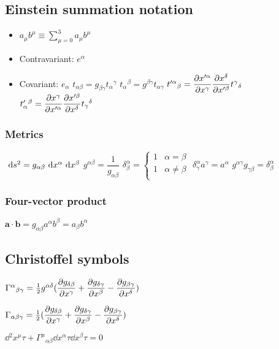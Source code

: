 		\subsection{Einstein summation notation}
        
\begin{itemize}
\item \( a_\mu b^\mu \equiv \sum\limits^3_{\mu=0} a_\mu b^\mu \)
\item Contravariant: $e^\alpha$
\item Covariant: $e_\alpha$
\itemt \( t_{\alpha\beta} = g_{\beta\gamma} t_\alpha{}^\gamma \)
\itemt \( t_\alpha{}^\beta = g^{\beta\gamma} t_{\alpha\gamma} \)
\itemt \( t'^\alpha{}_\beta = \dfrac{\partial x'^\alpha}{\partial x^\gamma} \dfrac{\partial x^\delta}{\partial x'^\beta} t^\gamma{}_\delta\)
\itemt \( t'_\alpha{}^\beta = \dfrac{\partial x^\gamma}{\partial x'^\alpha} \dfrac{\partial x'^\beta}{\partial x^\delta} t_\gamma{}^\delta\)
\end{itemize}

\subsubsection{Metrics}
\begin{itemize}
\itemt \( \ \mathrm{d}s^2 = g_{\alpha\beta} \ \mathrm{d}x^\alpha \ \mathrm{d}x^\beta \)
\itemt \( g^{\alpha\beta} = \dfrac{1}{g_{\alpha\beta}} \)
\itemt \( \delta^\alpha_\beta =
\begin{cases}
      1 & \alpha = \beta \\
      1	& \alpha \neq \beta \\
\end{cases}
\)
\itemt \( \delta^\alpha_\gamma a^\gamma = a^\alpha \)
\itemt \( g^{\alpha\gamma}g_{\gamma\beta} = \delta^\alpha_\beta \) %
\end{itemize}

\subsubsection{Four-vector product}
\begin{itemize}
\itemt \( \textbf{a}\cdot \textbf{b} = g_{\alpha\beta}a^\alpha b^\beta = a_\beta b^\alpha\)
\end{itemize}
        
		\subsection{Christoffel symbols}

\begin{itemize}
\itemt \( \Gamma^\alpha{}_{\beta\gamma} = \frac{1}{2} g^{\alpha\delta} (\dfrac{\partial g_{\delta\beta}}{\partial x^\gamma} + \dfrac{\partial g_{\delta\gamma}}{\partial x^\beta} - \dfrac{\partial g_{\beta\gamma}}{\partial x^\delta})  \) 

\itemt \( \Gamma_{\alpha\beta\gamma} = \frac{1}{2}(\dfrac{\partial g_{\delta\beta}}{\partial x^\gamma} + \dfrac{\partial g_{\delta\gamma}}{\partial x^\beta} - \dfrac{\partial g_{\beta\gamma}}{\partial x^\delta})  \) 

\itemt \( \dd{^2 x^\mu}{\tau} + \Gamma^\mu{}_{\alpha\beta} \dd{x^\alpha}{\tau} \dd{x^\beta}{\tau} = 0\)
\end{itemize}

